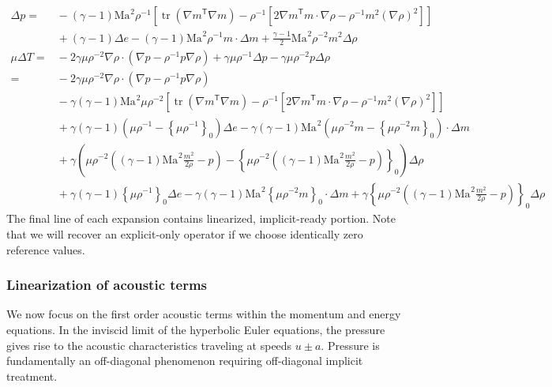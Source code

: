\documentclass[letterpaper,11pt,nointlimits,reqno,draft]{amsart}
\newcommand{\trans}[1]{{#1}^{\ensuremath{\mathsf{T}}}}
\newcommand{\Mach}[1][]{\ensuremath{\mbox{Ma}_{#1}}}
\newcommand{\reference}[1]{\ensuremath{\left\{#1\right\}_{0}}}
\newcommand{\lessreference}[1]
  {\ensuremath{\left({#1}-\reference{#1}\right)}}
\DeclareMathOperator{\trace}{tr}
\begin{document}
\begin{align}
\Delta{}p =
  &{}- \left(\gamma-1\right)\Mach^{2}\rho^{-1}\left[
             \trace\left(\trans{\nabla{}m}\nabla{}m\right)
           - \rho^{-1}\left[
               2\trans{\nabla{}m}m\cdot\nabla{}\rho
             - \rho^{-1} m^2 \left(\nabla\rho\right)^{2}
           \right]
       \right]
\\
  &{}+ \left(\gamma-1\right)\Delta{}e
     - \left(\gamma-1\right)\Mach^{2}\rho^{-1}m\cdot\Delta{}m
     + \frac{\gamma-1}{2}\Mach^{2}\rho^{-2}m^2 \Delta\rho
\\
\label{eq:linear_ready_delta_T}
\mu\Delta{}T =
  &{}- 2\gamma\mu\rho^{-2}\nabla\rho\cdot
       \left(\nabla{}p-\rho^{-1}p\nabla\rho\right)
     + \gamma\mu\rho^{-1}\Delta{}p
     - \gamma\mu\rho^{-2}p\Delta\rho
\\
=
  &{}- 2\gamma\mu\rho^{-2}\nabla{}\rho\cdot
       \left(\nabla{}p-\rho^{-1}p\nabla\rho\right)
\\
  &{}- \gamma\left(\gamma-1\right)\Mach^{2}\mu\rho^{-2}\left[
             \trace\left(\trans{\nabla{}m}\nabla{}m\right)
           - \rho^{-1}\left[
               2\trans{\nabla{}m}m\cdot\nabla{}\rho
             - \rho^{-1} m^2 \left(\nabla\rho\right)^{2}
           \right]
       \right]
\\
  &{}+ \gamma\left(\gamma-1\right)\lessreference{\mu\rho^{-1}}\Delta{}e
     - \gamma\left(\gamma-1\right)\Mach^{2}
       \lessreference{\mu\rho^{-2}m}\cdot\Delta{}m
\\
  &{}+ \gamma\lessreference{ \mu\rho^{-2}\left(
           \left(\gamma-1\right)\Mach^{2} \frac{m^2}{2\rho} - p
       \right) } \Delta\rho
\\
  &{}+ \gamma\left(\gamma-1\right)\reference{\mu\rho^{-1}}\Delta{}e
     - \gamma\left(\gamma-1\right)\Mach^{2}
       \reference{\mu\rho^{-2}m}\cdot\Delta{}m
   {}+ \gamma\reference{ \mu\rho^{-2}\left(
           \left(\gamma-1\right)\Mach^{2} \frac{m^2}{2\rho} - p
       \right) } \Delta\rho
\end{align}
The final line of each expansion contains linearized, implicit-ready portion.
Note that we will recover an explicit-only operator if we choose identically
zero reference values.

\subsubsection{Linearization of acoustic terms}

We now focus on the first order acoustic terms within the momentum and energy
equations.  In the inviscid limit of the hyperbolic Euler equations, the
pressure gives rise to the acoustic characteristics traveling at speeds
$u\pm{}a$.  Pressure is fundamentally an off-diagonal phenomenon requiring
off-diagonal implicit treatment.
\end{document}
